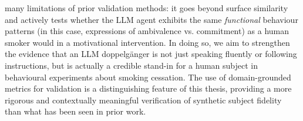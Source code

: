 many limitations of prior validation methods: it goes beyond surface similarity and
actively tests whether the LLM agent exhibits the same \emph{functional} behaviour
patterns (in this case, expressions of ambivalence vs. commitment) as a human smoker
would in a motivational intervention. In doing so, we aim to strengthen the evidence
that an LLM doppelgänger is not just speaking fluently or following instructions, but
is actually a credible stand-in for a human subject in behavioural experiments about
smoking cessation. The use of domain-grounded metrics for validation is a
distinguishing feature of this thesis, providing a more rigorous and contextually
meaningful verification of synthetic subject fidelity than what has been seen in prior
work.
